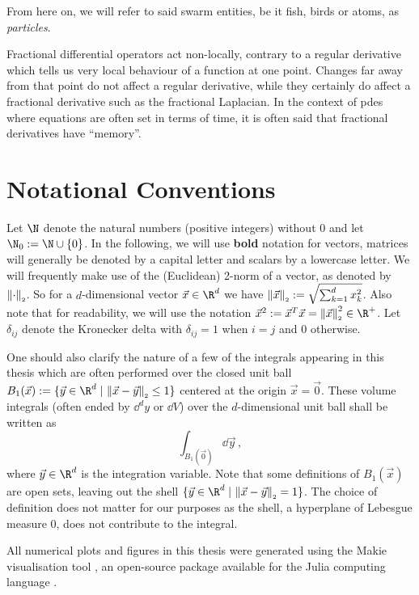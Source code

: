 From here on, we will refer to said swarm entities, be it fish, birds or atoms, as \textit{particles}.

Fractional differential operators act non-locally, contrary to a regular derivative which tells us very local behaviour of a function at one point.
Changes far away from that point do not affect a regular derivative, while they certainly do affect a fractional derivative such as the fractional Laplacian.
In the context of \gls{pde}s where equations are often set in terms of time, it is often said that fractional derivatives have ``memory''.

\section{Notational Conventions}
Let $\N$ denote the natural numbers (positive integers) without $0$ and let $\N_0 := \N \cup \{0\}$.
In the following, we will use \textbf{bold} notation for vectors, matrices will generally be denoted by a capital letter and scalars by a lowercase letter.
We will frequently make use of the (Euclidean) 2-norm of a vector, as denoted by $\left\lVert\cdot\right\rVert_{\scriptscriptstyle 2}$.
So for a $d$-dimensional vector $\vec{x} \in \R^d$ we have $\left\lVert\vec{x}\right\rVert_{\scriptscriptstyle 2} := \sqrt{\sum_{k=1}^d x_k^2}$.
Also note that for readability, we will use the notation $\vec{x}^2 := \vec{x}^T \vec{x} = \norm{\vec{x}}^2 \in \R^+$.
Let $\delta_{ij}$ denote the Kronecker delta with $\delta_{ij} = 1$ when $i=j$ and $0$ otherwise.

One should also clarify the nature of a few of the integrals appearing in this thesis which are often performed over the closed unit ball $B_1(\vec{x}) := \{\vec{y} \in \R^d \;|\, \norm{\vec{x} - \vec{y}} \le 1\}$ centered at the origin $\vec{x} = \vec{0}$.
These volume integrals (often ended by $\dd^d y$ or $\dd V$) over the $d$-dimensional unit ball shall be written as
$$\int_{B_1(\vec{0})} \dd\vec{y}\,,$$
where $\vec{y} \in \R^d$ is the integration variable.
Note that some definitions of $B_1(\vec{x})$ are open sets, leaving out the shell $\{\vec{y} \in \R^d \;|\, \norm{\vec{x} - \vec{y}} = 1\}$.
The choice of definition does not matter for our purposes as the shell, a hyperplane of Lebesgue measure $0$, does not contribute to the integral.

All numerical plots and figures in this thesis were generated using the Makie visualisation tool \parencite{2021-makie}, an open-source package available for the Julia computing language \parencite{2017-julia}.
